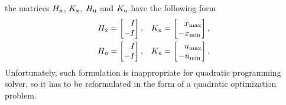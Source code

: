 the matrices $H _{\text{x}}$, $K _{\text{x}}$, $H _{\text{u}}$ and $K _{\text{u}}$ have the following form
\begin{subequations}
	\begin{align}
		H _{\text{x}} = \begin{bmatrix}
						\ \ \,I\\-I
					\end{bmatrix},\quad & 
		K _{\text{x}} = \begin{bmatrix}
						\ \ \,x _{\text{max}}\\-x _{\text{min}}
					\end{bmatrix},\\
		H _{\text{u}} = \begin{bmatrix}
						\ \ \,I\\-I
					\end{bmatrix},\quad & 
		K _{\text{u}} = \begin{bmatrix}
						\ \ \,u _{\text{max}}\\-u _{\text{min}}
					\end{bmatrix}.
	\end{align}
\end{subequations}
Unfortunately, such formulation is inappropriate for quadratic programming solver, so it has to be reformulated in the form of a quadratic optimization problem.
